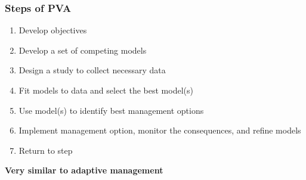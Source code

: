 \documentclass[color=usenames,dvipsnames]{beamer}\usepackage[]{graphicx}\usepackage[]{xcolor}
\begin{document}
\begin{frame}
  \frametitle{Steps of PVA}
  \large
  \begin{enumerate}[(1)]%
    \item Develop objectives
    \item Develop a set of competing models
    \item Design a study to collect necessary data
    \item Fit models to data and select the best model(s)
    \item Use model(s) to identify best management options
    \item Implement management option, monitor the consequences, and refine models
    \item Return to step \color{beamer@blendedblue}{(4)}%
  \end{enumerate}
  \vfill
  \centering
  \pause
  {\bf Very similar to adaptive management \\}
\end{frame}
\end{document}
